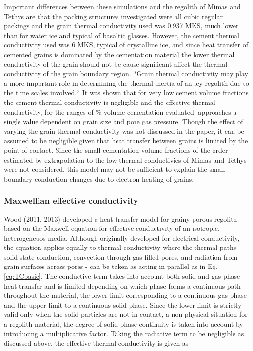 \documentclass[11pt]{article} %
\begin{document}
	Important differences between these simulations and the regolith of Mimas and Tethys are that the packing structures investigated were all cubic regular packings and the grain thermal conductivity used was 0.937 MKS, much lower than for water ice and typical of basaltic glasses. However, the cement thermal conductivity used was 6 MKS, typical of crystalline ice, and since heat transfer of cemented grains is dominated by the cementation material the lower thermal conductivity of the grain should not be cause significant affect the thermal conductivity of the grain boundary region. *Grain thermal conductivity may play a more important role in determining the thermal inertia of an icy regolith due to the time scales involved.* It was shown that for very low cement volume fractions the cement thermal conductivity is negligible and the effective thermal conductivity, for the ranges of \% volume cementation evaluated, approaches a single value dependent on grain size and pore gas pressure. Though the effect of varying the grain thermal conductivity was not discussed in the paper, it can be assumed to be negligible given that heat transfer between grains is limited by the point of contact. Since the small cementation volume fractions of the order estimated by extrapolation to the low thermal conductivies of Mimas and Tethys were not considered, this model may not be sufficient to explain the small boundary conduction changes due to electron heating of grains.

\subsubsection{Maxwellian effective conductivity}
	 Wood (2011, 2013) developed a heat transfer model for grainy porous regolith based on the Maxwell equation for effective conductivity of an isotropic, heterogeneuos media. Although originally developed for electrical conductivity, the equation applies equally to thermal conductivity where the thermal paths - solid state conduction, convection through gas filled pores, and radiation from grain surfaces across pores - can be taken as acting in parallel as in Eq.\ref{eq:TCbasic}. The conductive term takes into account both solid and gas phase heat transfer and is limited depending on which phase forms a continuous path throughout the material, the lower limit corresponding to a continuous gas phase and the upper limit to a continuous solid phase. Since the lower limit is strictly valid only when the solid particles are not in contact, a non-physical situation for a regolith material, the degree of solid phase continuity is taken into account by introducing a multiplicative factor. Taking the radiative term to be negligible as discussed above, the effective thermal conductivity is given as
	
\end{document}
